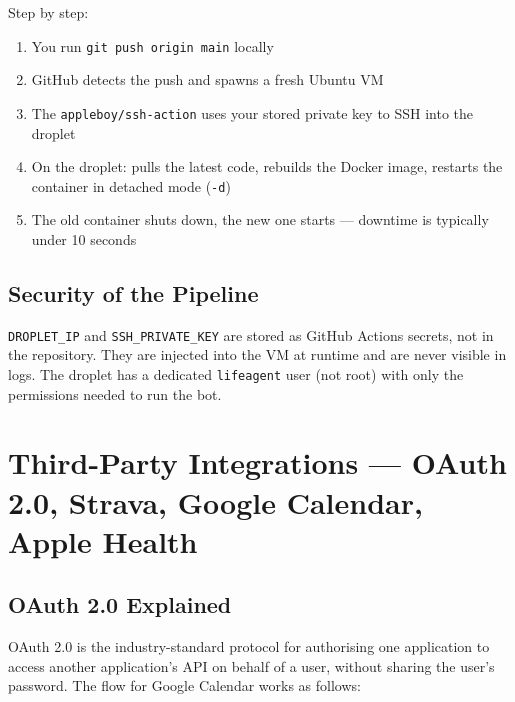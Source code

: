 \documentclass[12pt, a4paper]{article}
\begin{document}
Step by step:
\begin{enumerate}[noitemsep]
    \item You run \texttt{git push origin main} locally
    \item GitHub detects the push and spawns a fresh Ubuntu VM
    \item The \texttt{appleboy/ssh-action} uses your stored private key to SSH into the droplet
    \item On the droplet: pulls the latest code, rebuilds the Docker image, restarts the container in detached mode (\texttt{-d})
    \item The old container shuts down, the new one starts --- downtime is typically under 10 seconds
\end{enumerate}

\subsection{Security of the Pipeline}

\texttt{DROPLET\_IP} and \texttt{SSH\_PRIVATE\_KEY} are stored as GitHub Actions secrets, not in the repository. They are injected into the VM at runtime and are never visible in logs. The droplet has a dedicated \texttt{lifeagent} user (not root) with only the permissions needed to run the bot.

\section{Third-Party Integrations --- OAuth 2.0, Strava, Google Calendar, Apple Health}

\subsection{OAuth 2.0 Explained}

OAuth 2.0 is the industry-standard protocol for authorising one application to access another application's API on behalf of a user, without sharing the user's password. The flow for Google Calendar works as follows:
\end{document}
